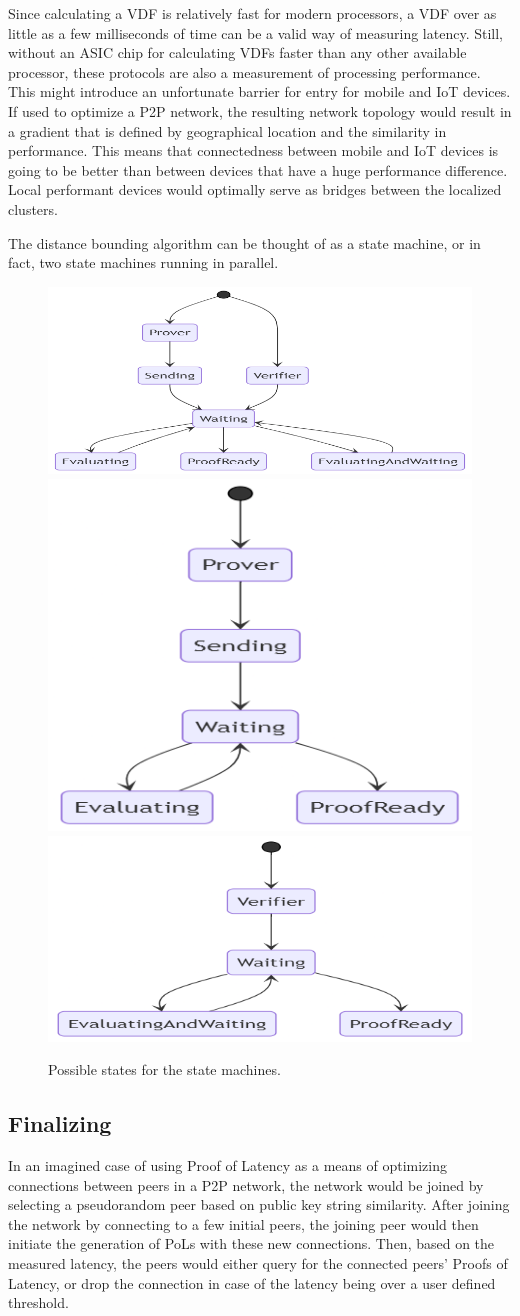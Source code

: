 Since calculating a VDF is relatively fast for modern processors, a VDF over as little as a few milliseconds of time can be a valid way of measuring latency. Still, without an ASIC chip for calculating VDFs faster than any other available processor, these protocols are also a measurement of processing performance. This might introduce an unfortunate barrier for entry for mobile and IoT devices. If used to optimize a P2P network, the resulting network topology would result in a gradient that is defined by geographical location and the similarity in performance. This means that connectedness between mobile and IoT devices is going to be better than between devices that have a huge performance difference. Local performant devices would optimally serve as bridges between the localized clusters.

The distance bounding algorithm can be thought of as a state machine, or in fact, two state machines running in parallel.

\begin{figure}[htp]

	\centering
	\includegraphics[width=.3\textwidth]{pictures/mermaid-diagram-20210505012010.png}\hfill
	\includegraphics[width=.3\textwidth]{pictures/mermaid-diagram-20210505014229.png}\hfill
	\includegraphics[width=.3\textwidth]{pictures/mermaid-diagram-20210505015712.png}

	\caption{Possible states for the state machines.}
	\label{Protocol States}

\end{figure}

\subsection{Finalizing}
In an imagined case of using Proof of Latency as a means of optimizing connections between peers in a P2P network, the network would be joined by selecting a pseudorandom peer based on public key string similarity. After joining the network by connecting to a few initial peers, the joining peer would then initiate the generation of PoLs with these new connections. Then, based on the measured latency, the peers would either query for the connected peers' Proofs of Latency, or drop the connection in case of the latency being over a user defined threshold.

